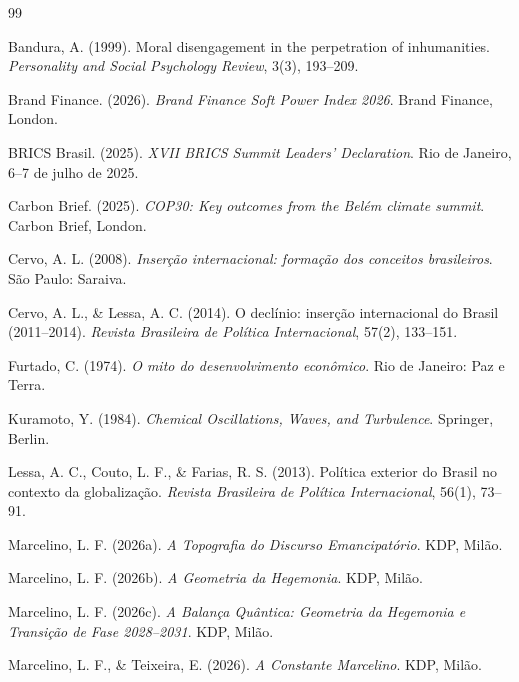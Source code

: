 \documentclass[12pt]{article}
\theoremstyle{definition}
\theoremstyle{remark}
\begin{document}
\begin{thebibliography}{99}

Bandura, A. (1999). Moral disengagement in the perpetration of inhumanities. \textit{Personality and Social Psychology Review}, 3(3), 193--209.

Brand Finance. (2026). \textit{Brand Finance Soft Power Index 2026}. Brand Finance, London.

BRICS Brasil. (2025). \textit{XVII BRICS Summit Leaders' Declaration}. Rio de Janeiro, 6--7 de julho de 2025.

Carbon Brief. (2025). \textit{COP30: Key outcomes from the Belém climate summit}. Carbon Brief, London.

Cervo, A. L. (2008). \textit{Inser\c{c}\~{a}o internacional: forma\c{c}\~{a}o dos conceitos brasileiros}. S\~{a}o Paulo: Saraiva.

Cervo, A. L., \& Lessa, A. C. (2014). O declínio: inser\c{c}\~{a}o internacional do Brasil (2011--2014). \textit{Revista Brasileira de Pol\'{i}tica Internacional}, 57(2), 133--151.

Furtado, C. (1974). \textit{O mito do desenvolvimento econômico}. Rio de Janeiro: Paz e Terra.

Kuramoto, Y. (1984). \textit{Chemical Oscillations, Waves, and Turbulence}. Springer, Berlin.

Lessa, A. C., Couto, L. F., \& Farias, R. S. (2013). Pol\'{i}tica exterior do Brasil no contexto da globaliza\c{c}\~{a}o. \textit{Revista Brasileira de Pol\'{i}tica Internacional}, 56(1), 73--91.

Marcelino, L. F. (2026a). \textit{A Topografia do Discurso Emancipat\'{o}rio}. KDP, Mil\~{a}o.

Marcelino, L. F. (2026b). \textit{A Geometria da Hegemonia}. KDP, Mil\~{a}o.

Marcelino, L. F. (2026c). \textit{A Balan\c{c}a Qu\^{a}ntica: Geometria da Hegemonia e Transi\c{c}\~{a}o de Fase 2028--2031}. KDP, Mil\~{a}o.

Marcelino, L. F., \& Teixeira, E. (2026). \textit{A Constante Marcelino}. KDP, Mil\~{a}o.


\end{thebibliography}
\end{document}
